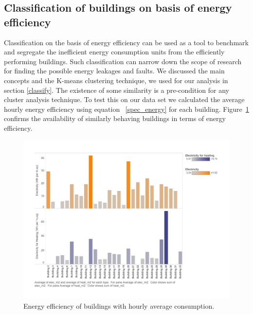 \subsection{Classification of buildings on basis of energy efficiency}
Classification on the basis of energy efficiency can be used as a tool to benchmark and segregate the inefficient energy consumption units from the efficiently performing buildings. Such classification can narrow down the scope of research for finding the possible energy leakages and faults. We discussed the main concepts and the K-means clustering technique, we used for our analysis in section \ref{classify}. The existence of some similarity is a pre-condition for any cluster analysis technique. To test this on our data set we calculated the average hourly energy efficiency using equation ~\ref{spec_energy} for each building. Figure~\ref{fig:hr_m2} confirms the availability of similarly behaving buildings in terms of energy efficiency. 
\begin{figure}[!ht]
    \begin{center}
      \includegraphics[scale = 0.6]{images/hr_m2.pdf}
      \caption{Energy efficiency of buildings with hourly average consumption.}
      \label{fig:hr_m2}
    \end{center}
\end{figure} 

